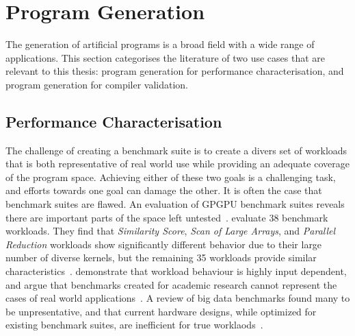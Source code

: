 \section{Program Generation}
\label{sec:related-work-generation}

The generation of artificial programs is a broad field with a wide range of applications. This section categorises the literature of two use cases that are relevant to this thesis: program generation for performance characterisation, and program generation for compiler validation.

\subsection{Performance Characterisation}
\label{subsec:training-with-synthetic-benchmarks}

The challenge of creating a benchmark suite is to create a divers set of workloads that is both representative of real world use while providing an adequate coverage of the program space. Achieving either of these two goals is a challenging task, and efforts towards one goal can damage the other. It is often the case that benchmark suites are flawed.
An evaluation of GPGPU benchmark suites reveals there are important parts of the space left untested~\cite{Ryoo2015}.
\citeauthor{Goswami2010} evaluate 38 benchmark workloads. They find that \emph{Similarity Score}, \emph{Scan of Large Arrays}, and \emph{Parallel Reduction} workloads show significantly different behavior due to their large number of diverse kernels, but the remaining 35 workloads provide similar characteristics~\cite{Goswami2010}.
\citeauthor{Xiong2013} demonstrate that workload behaviour is highly input dependent, and argue that benchmarks created for academic research cannot represent the cases of real world applications~\cite{Xiong2013}.
A review of big data benchmarks found many to be unpresentative, and that current hardware designs, while optimized for existing benchmark suites, are inefficient for true worklaods~\cite{Ferdman2012}.

